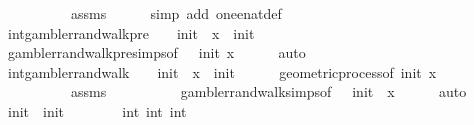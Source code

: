 \begin{isabellebody}
\ \ \ \ \ \ \ \ \ \ assms\isanewline
\ \ \ \ \isamarkupfalse%
\ {\isacharparenleft}{\kern0pt}simp\ add{\isacharcolon}{\kern0pt}\ one{\isacharunderscore}{\kern0pt}enat{\isacharunderscore}{\kern0pt}def{\isacharparenright}{\kern0pt}\isanewline
\ \ \isamarkupfalse%
\ int{}{\isacharcolon}{\kern0pt}{\isachardoublequoteopen}gambler{\isacharunderscore}{\kern0pt}rand{\isacharunderscore}{\kern0pt}walk{\isacharunderscore}{\kern0pt}pre\ {}\ {\isacharparenleft}{\kern0pt}{\isacharminus}{\kern0pt}\ {}{\isacharparenright}{\kern0pt}\ init\ {}\ x\ {\isacharequal}{\kern0pt}\ init{\isachardoublequoteclose}\isanewline
\ \ \ \ \isamarkupfalse%
\ gambler{\isacharunderscore}{\kern0pt}rand{\isacharunderscore}{\kern0pt}walk{\isacharunderscore}{\kern0pt}pre{\isachardot}{\kern0pt}simps{\isacharparenleft}{\kern0pt}{}{\isacharparenright}{\kern0pt}{\isacharbrackleft}{\kern0pt}of\ {}\ {\isachardoublequoteopen}{\isacharminus}{\kern0pt}{}{\isachardoublequoteclose}\ init\ x{\isacharbrackright}{\kern0pt}\isanewline
\ \ \ \ \isamarkupfalse%
\ auto\isanewline
\ \ \isamarkupfalse%
\ int{}{\isacharcolon}{\kern0pt}{\isachardoublequoteopen}gambler{\isacharunderscore}{\kern0pt}rand{\isacharunderscore}{\kern0pt}walk\ {}\ {\isacharparenleft}{\kern0pt}{\isacharminus}{\kern0pt}\ {}{\isacharparenright}{\kern0pt}\ init\ {}\ x\ {\isacharequal}{\kern0pt}\ init{\isacharprime}{\kern0pt}{\isachardoublequoteclose}\isanewline
\ \ \ \ \isamarkupfalse%
\ geometric{\isacharunderscore}{\kern0pt}process{\isacharbrackleft}{\kern0pt}of\ init\ x\ {}{\isacharbrackright}{\kern0pt}\isanewline
\ \ \ \ \ \ \ \ \ \ assms{\isacharparenleft}{\kern0pt}{}{\isacharparenright}{\kern0pt}\isanewline
\ \ \ \ \ \ \ \ \ \ gambler{\isacharunderscore}{\kern0pt}rand{\isacharunderscore}{\kern0pt}walk{\isachardot}{\kern0pt}simps{\isacharbrackleft}{\kern0pt}of\ {}\ {\isachardoublequoteopen}{\isacharminus}{\kern0pt}{}{\isachardoublequoteclose}\ init\ {}\ x{\isacharbrackright}{\kern0pt}\isanewline
\ \ \ \ \isamarkupfalse%
\ auto\isanewline
\ \ \isamarkupfalse%
\ {\isachardoublequoteopen}init{\isacharprime}{\kern0pt}\ {\isacharequal}{\kern0pt}\ init\ {\isacharminus}{\kern0pt}\ {}{\isachardoublequoteclose}\isanewline
\ \ \ \ \isamarkupfalse%
\ int{}\ int{}\ int{}\isanewline

\end{isabellebody}
